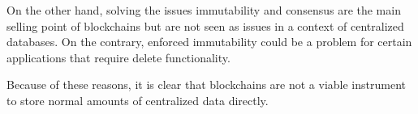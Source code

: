 \iffalse
- because in a context of centralized database, immutability and consensus as are not issues. Solving these problems is the main selling point of blockchain. Although it might be interesting that blockchain provides immutability, this could also be a problem. Some centralized databases might require delete functionality. This is no possible when using a blockchain

- not viable for storage of normal amounts of data
\fi

On the other hand, solving the issues immutability and consensus are the main selling point of blockchains but are not seen as issues in a context of centralized databases. On the contrary, enforced immutability could be a problem for certain applications that require delete functionality.

Because of these reasons, it is clear that blockchains are not a viable instrument to store normal amounts of centralized data directly.